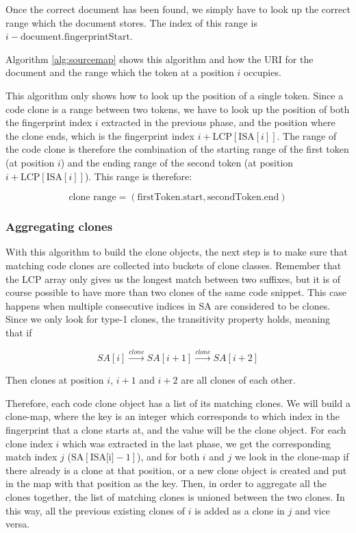 Once the correct document has been found, we simply have to look up the correct range
which the document stores. The index of this range is $i -
\text{document.fingerprintStart}$.

Algorithm \ref{alg:sourcemap} shows this algorithm and how the URI for the document and
the range which the token at a position $i$ occupies.

This algorithm only shows how to look up the position of a single token. Since a code
clone is a range between two tokens, we have to look up the position of both the
fingerprint index $i$ extracted in the previous phase, and the position where the clone
ends, which is the fingerprint index $i + \text{LCP}[\text{ISA}[i]]$. The range of the
code clone is therefore the combination of the starting range of the first token (at
position $i$) and the ending range of the second token (at position $i +
\text{LCP}[\text{ISA}[i]]$). This range is therefore:

$$
\text{clone range} = (\text{firstToken.start}, \text{secondToken.end})
$$

\subsubsection{Aggregating clones}

With this algorithm to build the clone objects, the next step is to make sure that
matching code clones are collected into buckets of clone classes. Remember that the LCP
array only gives us the longest match between two suffixes, but it is of course possible
to have more than two clones of the same code snippet. This case happens when multiple
consecutive indices in SA are considered to be clones. Since we only look for type-1
clones, the transitivity property holds, meaning that if

$$
SA[i] \xrightarrow{clone} SA[i+1] \xrightarrow{clone} SA[i + 2]
$$

Then clones at position $i$, $i+1$ and $i + 2$ are all clones of each other.

Therefore, each code clone object has a list of its matching clones. We will build a
clone-map, where the key is an integer which corresponds to which index in the fingerprint
that a clone starts at, and the value will be the clone object. For each clone index $i$
which was extracted in the last phase, we get the corresponding match index $j$
($\text{SA}[\text{ISA[i]} - 1]$), and for both $i$ and $j$ we look in the clone-map if
there already is a clone at that position, or a  new clone object is created and put in
the map with that position as the key. Then, in order to aggregate all the clones
together, the list of matching clones is unioned between the two clones. In this way, all
the previous existing clones of $i$ is added as a clone in $j$ and vice versa.


